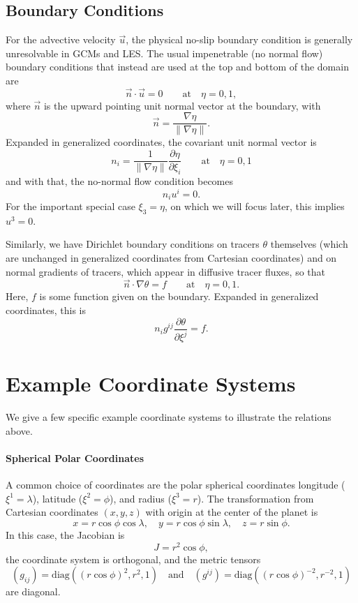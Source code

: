 \documentclass{report}
\begin{document}
\subsection{Boundary Conditions} For the advective velocity $\vec{u}$, the physical no-slip boundary condition is generally unresolvable in GCMs and LES. The usual impenetrable (no normal flow) boundary conditions that instead are used at the top and bottom of the domain are 
\[
\vec{n} \cdot \vec{u} = 0 \qquad \text{at} \quad \eta = 0, 1,
\]
where $\vec{n}$ is the upward pointing unit normal vector at the boundary, with 
\[
\vec{n} = \frac{\nabla \eta}{\|\nabla \eta\|}. 
\]
Expanded in generalized coordinates, the covariant unit normal vector is
\[
n_i = \frac{1}{\|\nabla\eta\|} \frac{\partial \eta}{\partial \xi_i} \qquad \text{at} \quad \eta = 0, 1
\]
and with that, the no-normal flow condition becomes
\[
n_i u^i = 0.
\]
For the important special case $\xi_3 = \eta$, on which we will focus later, this implies $u^3 = 0$.

Similarly, we have Dirichlet boundary conditions on tracers $\theta$ themselves (which are unchanged in generalized coordinates from Cartesian coordinates) and on normal gradients of tracers, which appear in diffusive tracer fluxes, so that
\[
\vec{n} \cdot \nabla \theta = f \qquad \text{at} \quad \eta = 0, 1.
\]
Here, $f$ is some function given on the boundary. Expanded in generalized coordinates, this is 
\[
n_i g^{ij} \frac{\partial \theta}{\partial \xi^j} = f.
\]

\section{Example Coordinate Systems}\label{s:example_coordinates}

We give a few specific example coordinate systems to illustrate the relations above.

\paragraph{Spherical Polar Coordinates} A common choice of coordinates are the polar spherical coordinates longitude ($\xi^1 = \lambda$), latitude ($\xi^2 = \phi$), and radius ($\xi^3 = r$). 
The transformation from Cartesian coordinates $(x, y, z)$ with origin at the center of the planet is
\begin{equation}
\label{e:spherical_polar_coordinates}
x = r\cos\phi\cos\lambda, \quad y = r\cos\phi\sin\lambda, \quad z = r\sin\phi.
\end{equation}
In this case, the Jacobian is
\[
J= r^2 \cos\phi,
\]
the coordinate system is orthogonal, and the metric tensors 
\begin{equation}\label{e:spherical_metric_tensors}
(g_{ij}) = \mathrm{diag}\left((r \cos\phi)^2, r^2, 1\right) 
\quad \text{and} \quad
(g^{ij}) = \mathrm{diag}\left((r \cos \phi)^{-2}, r^{-2},  1\right) 
\end{equation}
are diagonal.
\end{document}
